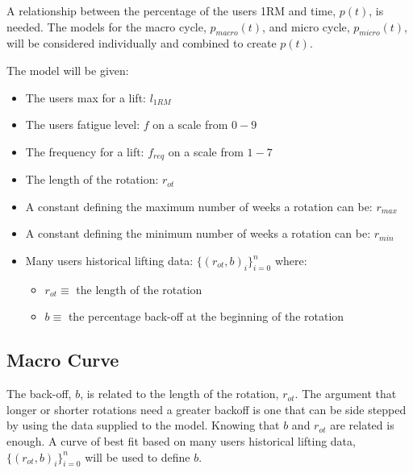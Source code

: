 A relationship between the percentage of the users 1RM and time, $p(t)$, is needed. The models for the macro cycle, $p_{macro}(t)$, and micro cycle, $p_{micro}(t)$, will be considered individually and combined to create $p(t)$.

The model will be given:
\begin{itemize}
    \item The users max for a lift: $l_{1RM}$
    \item The users fatigue level: $f$ on a scale from $0-9$
    \item The frequency for a lift: $f_{req}$ on a scale from $1-7$
    \item The length of the rotation: $r_{ot}$
    \item A constant defining the maximum number of weeks a rotation can be: $r_{max}$
    \item A constant defining the minimum number of weeks a rotation can be: $r_{min}$
    \item Many users historical lifting data: $\{(r_{ot},b)_i\}_{i=0}^n$ where:
    \begin{itemize}
        \item $r_{ot} \equiv$ the length of the rotation
        \item $b \equiv$ the percentage back-off at the beginning of the rotation
    \end{itemize}
\end{itemize}


\subsection{Macro Curve}

The back-off, $b$, is related to the length of the rotation, $r_{ot}$. The argument that longer or shorter rotations need a greater backoff is one that can be side stepped by using the data supplied to the model. Knowing that $b$ and $r_{ot}$ are related is enough. A curve of best fit based on many users historical lifting data, $\{(r_{ot},b)_i\}_{i=0}^n$ will be used to define $b$.

